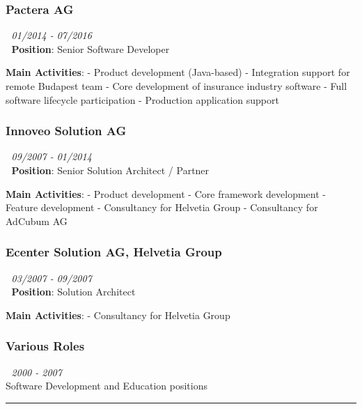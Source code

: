 \subsubsection{\texorpdfstring{\textbf{Pactera
AG}}{Pactera AG}}\label{pactera-ag}

📅 \emph{01/2014 - 07/2016}\\
🔹 \textbf{Position}: Senior Software Developer

\textbf{Main Activities}: - Product development (Java-based) -
Integration support for remote Budapest team - Core development of
insurance industry software - Full software lifecycle participation -
Production application support

\subsubsection{\texorpdfstring{\textbf{Innoveo Solution
AG}}{Innoveo Solution AG}}\label{innoveo-solution-ag}

📅 \emph{09/2007 - 01/2014}\\
🔹 \textbf{Position}: Senior Solution Architect / Partner

\textbf{Main Activities}: - Product development - Core framework
development - Feature development - Consultancy for Helvetia Group -
Consultancy for AdCubum AG

\subsubsection{\texorpdfstring{\textbf{Ecenter Solution AG, Helvetia
Group}}{Ecenter Solution AG, Helvetia Group}}\label{ecenter-solution-ag-helvetia-group}

📅 \emph{03/2007 - 09/2007}\\
🔹 \textbf{Position}: Solution Architect

\textbf{Main Activities}: - Consultancy for Helvetia Group

\subsubsection{\texorpdfstring{\textbf{Various
Roles}}{Various Roles}}\label{various-roles}

📅 \emph{2000 - 2007}\\
Software Development and Education positions

\begin{center}\rule{0.5\linewidth}{0.5pt}\end{center}


